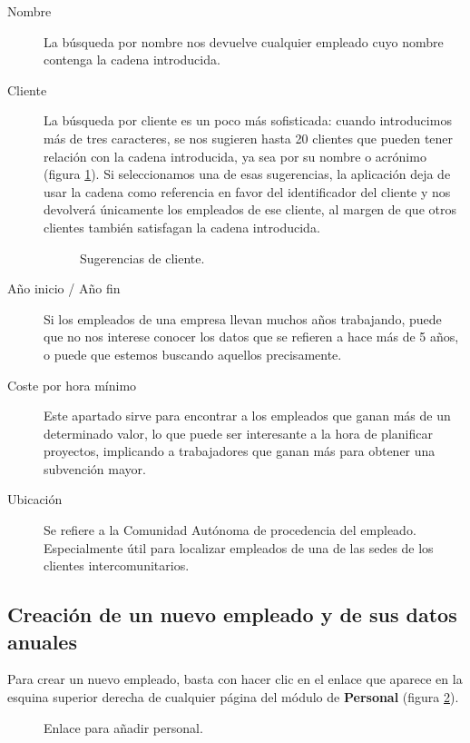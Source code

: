 \begin{description}
 \item[Nombre] La búsqueda por nombre nos devuelve cualquier empleado cuyo
nombre contenga la cadena introducida.
 \item[Cliente] La búsqueda por cliente es un poco más sofisticada: cuando
introducimos más de tres caracteres, se nos sugieren hasta 20 clientes que
pueden tener relación con la cadena introducida, ya sea por su nombre o
acrónimo (figura \ref{fig:sug_cliente}). Si seleccionamos una de esas
sugerencias, la aplicación deja de usar la cadena como referencia en favor del
identificador del cliente y nos devolverá únicamente los empleados de ese
cliente, al margen de que otros clientes también satisfagan la cadena
introducida.
  \begin{figure}
  \centering
  \caption{Sugerencias de cliente.}
  \label{fig:sug_cliente}
  \end{figure}
 \item[Año inicio / Año fin] Si los empleados de una empresa llevan muchos años
trabajando, puede que no nos interese conocer los datos que se refieren a hace
más de 5 años, o puede que estemos buscando aquellos precisamente.
 \item[Coste por hora mínimo] Este apartado sirve para encontrar a los
empleados que ganan más de un determinado valor, lo que puede ser interesante a
la hora de planificar proyectos, implicando a trabajadores que ganan más para
obtener una subvención mayor.
 \item[Ubicación] Se refiere a la Comunidad Autónoma de procedencia del
empleado. Especialmente útil para localizar empleados de una de las sedes de
los clientes intercomunitarios.

\end{description}

\subsection{Creación de un nuevo empleado y de sus datos anuales}

Para crear un nuevo empleado, basta con hacer clic en el enlace que aparece en
la esquina superior derecha de cualquier página del módulo de \textbf{Personal}
(figura \ref{fig:aniadir_persona}).

\begin{figure}
\centering
{}
\caption{Enlace para añadir personal.}
\label{fig:aniadir_persona}
\end{figure}

